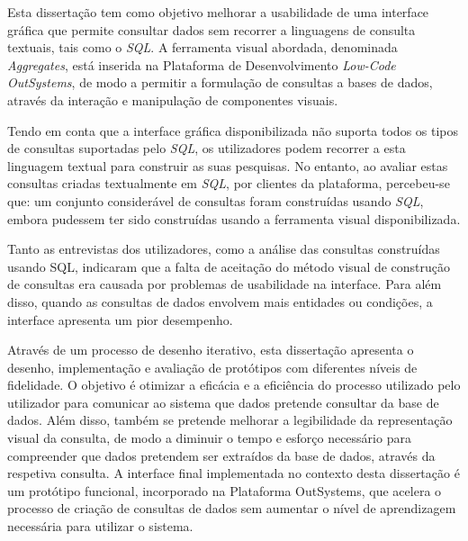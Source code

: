Esta dissertação tem como objetivo melhorar a usabilidade de uma interface gráfica que permite consultar dados sem recorrer a linguagens de consulta textuais, tais como o \textit{SQL}. A ferramenta visual abordada, denominada \textit{Aggregates}, está inserida na Plataforma de Desenvolvimento \textit{Low-Code} \textit{OutSystems}, de modo a permitir a formulação de consultas a bases de dados, através da interação e manipulação de componentes visuais.

Tendo em conta que a interface gráfica disponibilizada não suporta todos os tipos de consultas suportadas pelo \textit{SQL}, os utilizadores podem recorrer a esta linguagem textual para construir as suas pesquisas. No entanto, ao avaliar estas consultas criadas textualmente em \textit{SQL}, por clientes da plataforma, percebeu-se que: um conjunto considerável de consultas foram construídas usando \textit{SQL}, embora pudessem ter sido construídas usando a ferramenta visual disponibilizada.

Tanto as entrevistas dos utilizadores, como a análise das consultas construídas usando SQL, indicaram que a falta de aceitação do método visual de construção de consultas era causada por problemas de usabilidade na interface. Para além disso, quando as consultas de dados envolvem mais entidades ou condições, a interface apresenta um pior desempenho.

Através de um processo de desenho iterativo, esta dissertação apresenta o desenho, implementação e avaliação de protótipos com diferentes níveis de fidelidade. O objetivo é otimizar a eficácia e a eficiência do processo utilizado pelo utilizador para comunicar ao sistema que dados pretende consultar da base de dados. Além disso, também se pretende melhorar a legibilidade da representação visual da consulta, de modo a diminuir o tempo e esforço necessário para compreender que dados pretendem ser extraídos da base de dados, através da respetiva consulta. A interface final implementada no contexto desta dissertação é um protótipo funcional, incorporado na Plataforma OutSystems, que acelera o processo de criação de consultas de dados sem aumentar o nível de aprendizagem necessária para utilizar o sistema.


